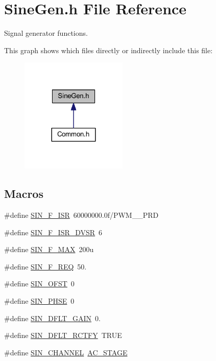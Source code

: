 \hypertarget{a00045}{\section{Sine\-Gen.\-h File Reference}
\label{a00045}
}


Signal generator functions.  


This graph shows which files directly or indirectly include this file\-:\nopagebreak
\begin{figure}[H]
\begin{center}
\leavevmode
\includegraphics[width=144pt]{a00075}
\end{center}
\end{figure}
\subsection*{Macros}
\begin{DoxyCompactItemize}
\item 
\#define \hyperlink{a00045_af54d156f326804e0c3d80e0b709d3406}{S\-I\-N\-\_\-\-F\-\_\-\-I\-S\-R}~60000000.\-0f/\-P\-W\-M\-\_\-\_\-\-P\-R\-D
\item 
\#define \hyperlink{a00045_ae3860ce29591dbf34c90a5cdce35ad86}{S\-I\-N\-\_\-\-F\-\_\-\-I\-S\-R\-\_\-\-D\-V\-S\-R}~6
\item 
\#define \hyperlink{a00045_a67755e274de5a3185ae6ce437a5f6e7d}{S\-I\-N\-\_\-\-F\-\_\-\-M\-A\-X}~200u
\item 
\#define \hyperlink{a00045_a58bd24055692a8794616ff2bc5c84d51}{S\-I\-N\-\_\-\-F\-\_\-\-R\-E\-Q}~50.
\item 
\#define \hyperlink{a00045_a992c375a2083a58aa46c0600fea7df64}{S\-I\-N\-\_\-\-O\-F\-S\-T}~0
\item 
\#define \hyperlink{a00045_abd714e85d6aa6a48b8d84a41b43074c2}{S\-I\-N\-\_\-\-P\-H\-S\-E}~0
\item 
\#define \hyperlink{a00045_aa63a6918009b4e4381e359cee2f05eef}{S\-I\-N\-\_\-\-D\-F\-L\-T\-\_\-\-G\-A\-I\-N}~0.
\item 
\#define \hyperlink{a00045_afc105af9d8f851266d0b8e8ffe57931a}{S\-I\-N\-\_\-\-D\-F\-L\-T\-\_\-\-R\-C\-T\-F\-Y}~T\-R\-U\-E
\item 
\#define \hyperlink{a00045_a71b6211a4d077af219d7e503f17114d1}{S\-I\-N\-\_\-\-C\-H\-A\-N\-N\-E\-L}~\hyperlink{a00027_a3fc4318ae73eae35339f616047300b0f}{A\-C\-\_\-\-S\-T\-A\-G\-E}
\end{DoxyCompactItemize}

